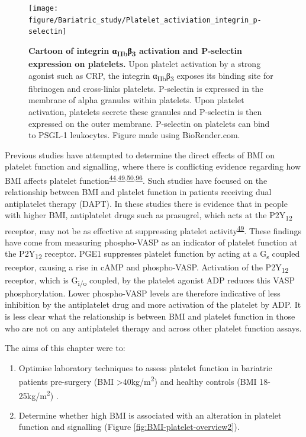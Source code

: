 \documentclass[11pt,twoside]{bristolthesis}
\providecommand{\tightlist}{%
  \setlength{\itemsep}{0pt}\setlength{\parskip}{0pt}}
\begin{document}
\begin{figure}

{\centering \texttt{[image: figure/Bariatric\_study/Platelet\_activiation\_integrin\_p-selectin]} 

}

\caption[Cartoon of integrin α\textsubscript{IIb}β\textsubscript{3} and P-selectin on platelets.]{\textbf{Cartoon of integrin α\textsubscript{IIb}β\textsubscript{3} activation and P-selectin expression on platelets.} Upon platelet activation by a strong agonist such as CRP, the integrin α\textsubscript{IIb}β\textsubscript{3} exposes its binding site for fibrinogen and cross-links platelets. P-selectin is expressed in the membrane of alpha granules within platelets. Upon platelet activation, platelets secrete these granules and P-selectin is then expressed on the outer membrane. P-selectin on platelets can bind to PSGL-1 leukocytes. Figure made using BioRender.com.}\label{fig:platelet-activation-2}
\end{figure}
Previous studies have attempted to determine the direct effects of BMI on platelet function and signalling, where there is conflicting evidence regarding how BMI affects platelet function\textsuperscript{\protect\hyperlink{ref-Nardin2015}{44},\protect\hyperlink{ref-Deharo2014}{49},\protect\hyperlink{ref-Sibbing2007}{50},\protect\hyperlink{ref-Barrachina2019}{96}}. Such studies have focused on the relationship between BMI and platelet function in patients receiving dual antiplatelet therapy (DAPT). In these studies there is evidence that in people with higher BMI, antiplatelet drugs such as prasugrel, which acts at the P2Y\textsubscript{12} receptor, may not be as effective at suppressing platelet activity\textsuperscript{\protect\hyperlink{ref-Deharo2014}{49}}. These findings have come from measuring phospho-VASP as an indicator of platelet function at the P2Y\textsubscript{12} receptor. PGE1 suppresses platelet function by acting at a G\textsubscript{s} coupled receptor, causing a rise in cAMP and phospho-VASP. Activation of the P2Y\textsubscript{12} receptor, which is G\textsubscript{i/o} coupled, by the platelet agonist ADP reduces this VASP phosphorylation. Lower phospho-VASP levels are therefore indicative of less inhibition by the antiplatelet drug and more activation of the platelet by ADP. It is less clear what the relationship is between BMI and platelet function in those who are not on any antiplatelet therapy and across other platelet function assays.

The aims of this chapter were to:
\begin{enumerate}
\def\labelenumi{\arabic{enumi})}
\tightlist
\item
  Optimise laboratory techniques to assess platelet function in bariatric patients pre-surgery (BMI \textgreater40kg/m\textsuperscript{2}) and healthy controls (BMI 18-25kg/m\textsuperscript{2}) .
\item
  Determine whether high BMI is associated with an alteration in platelet function and signalling (Figure \ref{fig:BMI-platelet-overview2}).
\end{enumerate}
\end{document}
